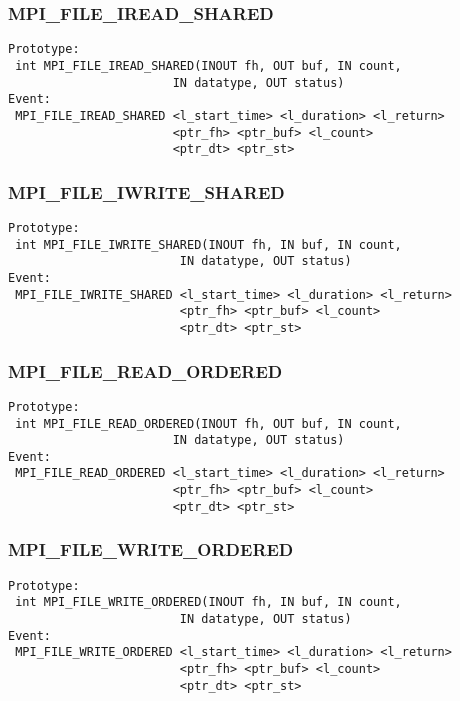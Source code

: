 \documentclass[9pt]{article}
\begin{document}
\subsubsection{MPI\_FILE\_IREAD\_SHARED}
\label{sec:MPIFILEIREADSHARED}
\begin{verbatim}
Prototype:
 int MPI_FILE_IREAD_SHARED(INOUT fh, OUT buf, IN count, 
                       IN datatype, OUT status)
Event:
 MPI_FILE_IREAD_SHARED <l_start_time> <l_duration> <l_return>
                       <ptr_fh> <ptr_buf> <l_count>
                       <ptr_dt> <ptr_st>
\end{verbatim}

\subsubsection{MPI\_FILE\_IWRITE\_SHARED}
\label{sec:MPIFILEIWRITESHARED}
\begin{verbatim}
Prototype:
 int MPI_FILE_IWRITE_SHARED(INOUT fh, IN buf, IN count, 
                        IN datatype, OUT status)
Event:
 MPI_FILE_IWRITE_SHARED <l_start_time> <l_duration> <l_return>
                        <ptr_fh> <ptr_buf> <l_count>
                        <ptr_dt> <ptr_st>
\end{verbatim}

\subsubsection{MPI\_FILE\_READ\_ORDERED}
\label{sec:MPIFILEREADORDERED}
\begin{verbatim}
Prototype:
 int MPI_FILE_READ_ORDERED(INOUT fh, OUT buf, IN count, 
                       IN datatype, OUT status)
Event:
 MPI_FILE_READ_ORDERED <l_start_time> <l_duration> <l_return>
                       <ptr_fh> <ptr_buf> <l_count>
                       <ptr_dt> <ptr_st>
\end{verbatim}

\subsubsection{MPI\_FILE\_WRITE\_ORDERED}
\label{sec:MPIFILEWRITEORDERED}
\begin{verbatim}
Prototype:
 int MPI_FILE_WRITE_ORDERED(INOUT fh, IN buf, IN count, 
                        IN datatype, OUT status)
Event:
 MPI_FILE_WRITE_ORDERED <l_start_time> <l_duration> <l_return>
                        <ptr_fh> <ptr_buf> <l_count>
                        <ptr_dt> <ptr_st>
\end{verbatim}
\end{document}
